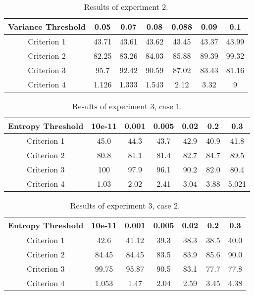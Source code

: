 \documentclass[journal]{IEEEtran}
\begin{document}
%

\begin{table*}[h!]
\begin{center}
    \caption{Results of experiment 2.}
    \label{tbl:table4}
  \begin{tabular}{c | c c c c c c}
\hline
    Variance Threshold & 0.05 & 0.07 & 0.08 & 0.088 & 0.09 & 0.1 \\ 
\hline
   Criterion 1 & 43.71	& 43.61 & 43.62 & 43.45 & 43.37 & 43.99 \\%
   Criterion 2 & 82.25 & 83.26 & 84.03 & 85.88 & 89.39 & 99.32 \\ %
   Criterion 3 & 95.7 & 92.42 & 90.59 & 87.02 & 	83.43 & 81.16 \\ %
   Criterion 4 & 1.126 & 1.333 & 1.543 & 2.12 & 3.32 & 9 \\ 
\hline
   \end{tabular}
\end{center}
\end{table*}

%

\begin{table*}[h!]
\begin{center}
    \caption{Results of experiment 3, case 1.}
    \label{tbl:table5}
  \begin{tabular}{c | c c c c c c}
\hline
    Entropy Threshold & 10e-11 & 0.001 & 0.005 & 0.02 & 0.2 & 0.3 \\ 
\hline
   Criterion 1 & 45.0 & 44.3 & 43.7 & 42.9 & 40.9 & 41.8 \\%
   Criterion 2 & 80.8 & 81.1 & 81.4 & 82.7 & 84.7 & 89.5 \\ %
   Criterion 3 & 100 & 97.9 & 96.1 & 90.2 & 82.0 & 80.4 \\ %
   Criterion 4 & 1.03 & 2.02 & 2.41 & 3.04 & 3.88 & 5.021 \\ 
\hline
   \end{tabular}
\end{center}
\end{table*}

%

\begin{table*}[h!]
\begin{center}
    \caption{Results of experiment 3, case 2.}
    \label{tbl:table6}
  \begin{tabular}{c | c c c c c c}
\hline
    Entropy Threshold & 10e-11 & 0.001 & 0.005 & 0.02 & 0.2 & 0.3 \\ 
\hline
   Criterion 1 & 42.6 & 41.12 & 39.3 & 38.3 & 38.5 & 40.0 \\%
   Criterion 2 & 84.45 & 84.45 & 83.5 & 83.9 & 85.6 & 90.0 \\ %
   Criterion 3 & 99.75 & 95.87 & 90.5 & 83.1 & 77.7 & 77.8 \\ %
   Criterion 4 & 1.053 & 1.47 & 2.04 & 2.59 & 3.45 & 4.38 \\ 
\hline
   \end{tabular}
\end{center}
\end{table*}
\end{document}
